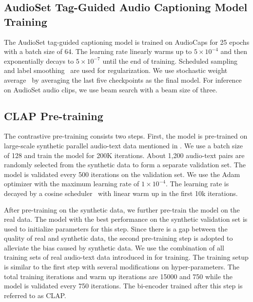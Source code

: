 \documentclass[sigconf,anonymous,review]{acmart}
\begin{document}
\subsection{AudioSet Tag-Guided Audio Captioning Model Training}
\label{subsec:syn_data_generation_setup}

The AudioSet tag-guided captioning model is trained on AudioCaps for 25 epochs with a batch size of 64.
The learning rate linearly warms up to $5\times10^{-4}$ and then exponentially decays to $5\times10^{-7}$ until the end of training.
Scheduled sampling~\cite{bengio2015scheduled} and label smoothing~\cite{szegedy2016rethinking} are used for regularization.
We use stochastic weight average~\cite{izmailov2018averaging} by averaging the last five checkpoints as the final model.
For inference on AudioSet audio clips, we use beam search with a beam size of three.

\subsection{CLAP Pre-training}
The contrastive pre-training consists two steps.
First, the model is pre-trained on large-scale synthetic parallel audio-text data mentioned in .
We use a batch size of 128 and train the model for 200K iterations.
About 1,200 audio-text pairs are randomly selected from the synthetic data to form a separate validation set.
The model is validated every 500 iterations on the validation set.
We use the Adam optimizer with the maximum learning rate of $1\times10^{-4}$.
The learning rate is decayed by a cosine scheduler~\cite{loshchilov2016sgdr} with linear warm up in the first 10k iterations.

After pre-training on the synthetic data, we further pre-train the model on the real data.
The model with the best performance on the synthetic validation set is used to initialize parameters for this step.
Since there is a gap between the quality of real and synthetic data, the second pre-training step is adopted to alleviate the bias caused by synthetic data.
We use the combination of all training sets of real audio-text data introduced in  for training.
The training setup is similar to the first step with several modifications on hyper-parameters.
The total training iterations and warm up iterations are 15000 and 750 while the model is validated every 750 iterations.
The bi-encoder trained after this step is referred to as CLAP.
\end{document}
